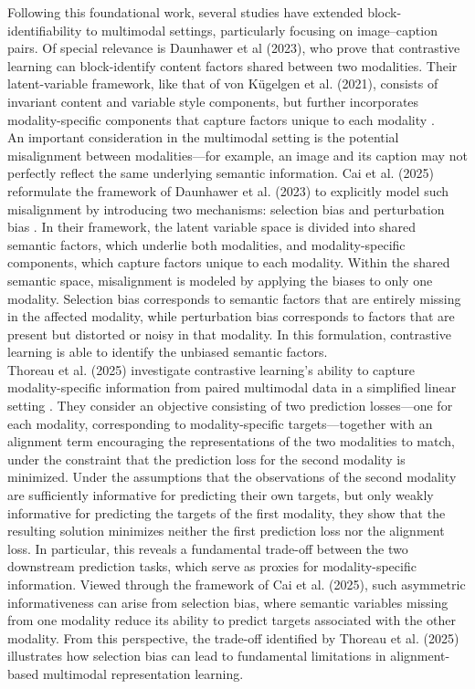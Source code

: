 \documentclass[a4paper,12pt]{article}
\begin{document}
Following this foundational work, several studies have extended block-identifiability to multimodal settings, particularly focusing on image–caption pairs. Of special relevance is Daunhawer et al (2023), who prove that contrastive learning can block-identify content factors shared between two modalities. Their latent-variable framework, like that of von Kügelgen et al. (2021), consists of invariant content and variable style components, but further incorporates modality-specific components that capture factors unique to each modality \cite{daunhawer2023identifiabilityresultsmultimodalcontrastive}. \\

An important consideration in the multimodal setting is the potential misalignment between modalities—for example, an image and its caption may not perfectly reflect the same underlying semantic information. Cai et al. (2025) reformulate the framework of Daunhawer et al. (2023) to explicitly model such misalignment by introducing two mechanisms: selection bias and perturbation bias  \cite{cai2025valuecrossmodalmisalignmentmultimodal}. In their framework, the latent variable space is divided into shared semantic factors, which underlie both modalities, and modality-specific components, which capture factors unique to each modality. Within the shared semantic space, misalignment is modeled by applying the biases to only one modality. Selection bias corresponds to semantic factors that are entirely missing in the affected modality, while perturbation bias corresponds to factors that are present but distorted or noisy in that modality. In this formulation, contrastive learning is able to identify the unbiased semantic factors. \\

Thoreau et al. (2025) investigate contrastive learning’s ability to capture modality-specific information from paired multimodal data in a simplified linear setting \cite{thoreau2025multimodalrepresentationlearningalignment}. They consider an objective consisting of two prediction losses—one for each modality, corresponding to modality-specific targets—together with an alignment term encouraging the representations of the two modalities to match, under the constraint that the prediction loss for the second modality is minimized. Under the assumptions that the observations of the second modality are sufficiently informative for predicting their own targets, but only weakly informative for predicting the targets of the first modality, they show that the resulting solution minimizes neither the first prediction loss nor the alignment loss. In particular, this reveals a fundamental trade-off between the two downstream prediction tasks, which serve as proxies for modality-specific information. Viewed through the framework of Cai et al. (2025), such asymmetric informativeness can arise from selection bias, where semantic variables missing from one modality reduce its ability to predict targets associated with the other modality. From this perspective, the trade-off identified by Thoreau et al. (2025) illustrates how selection bias can lead to fundamental limitations in alignment-based multimodal representation learning. \\
\end{document}
